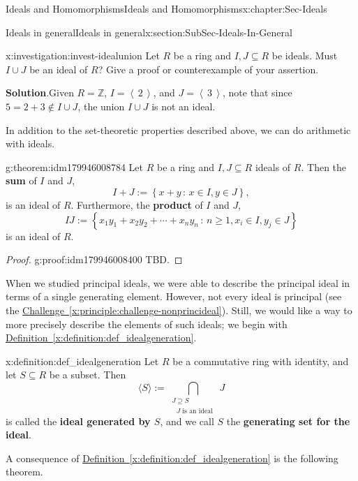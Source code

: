 \documentclass[oneside,10pt,]{book}
\newcommand{\blocktitlefont}{\relax}
\newcommand{\xreffont}{\relax}
\newcommand{\terminology}[1]{\textbf{#1}}
\numberwithin{equation}{section}
\renewcommand{\ge}{\geqslant}
\newcommand{\ideal}[1]{\left\langle\, #1 \,\right\rangle}
\newcommand{\setof}[2]{{\left\{#1\,\colon\,#2\right\}}}
\def\Z{{\mathbb Z}}
\begin{document}
\begin{chapterptx}{Ideals and Homomorphisms}{}{Ideals and Homomorphisms}{}{}{x:chapter:Sec-Ideals}
\begin{sectionptx}{Ideals in general}{}{Ideals in general}{}{}{x:section:SubSec-Ideals-In-General}
\begin{investigation}{}{x:investigation:invest-idealunion}
Let \(R\) be a ring and \(I,J\subseteq R\) be ideals. Must \(I\cup J\) be an ideal of \(R\)? Give a proof or counterexample of your assertion.%
\par\smallskip%
\noindent\textbf{\blocktitlefont Solution}.\hypertarget{g:solution:idm179946013984}{}\quad{}Given \(R = \Z\), \(I = \ideal{2}\), and \(J = \ideal{3}\), note that since \(5 = 2 + 3\notin I\cup J\), the union \(I\cup J\) is not an ideal.%
\end{investigation}
In addition to the set-theoretic properties described above, we can do arithmetic with ideals.%
\begin{theorem}{}{}{g:theorem:idm179946008784}%
Let \(R\) be a ring and \(I,J\subseteq R\) ideals of \(R\). Then the \terminology{sum} of \(I\) and \(J\),%
\begin{equation*}
I+J := \setof{x+y}{x\in I, y\in J},
\end{equation*}
is an ideal of \(R\). Furthermore, the \terminology{product} of \(I\) and \(J\),%
\begin{equation*}
IJ := \setof{x_1 y_1 + x_2 y_2 + \cdots + x_n y_n}{n\ge 1, x_i \in I, y_j\in J}
\end{equation*}
is an ideal of \(R\).%
\end{theorem}
\begin{proof}{}{g:proof:idm179946008400}
TBD.\end{proof}
When we studied principal ideals, we were able to describe the principal ideal in terms of a single generating element. However, not every ideal is principal (see the \hyperref[x:principle:challenge-nonprincideal]{Challenge~{\xreffont\ref{x:principle:challenge-nonprincideal}}}). Still, we would like a way to more precisely describe the elements of such ideals; we begin with \hyperref[x:definition:def_idealgeneration]{Definition~{\xreffont\ref{x:definition:def_idealgeneration}}}.%
\begin{definition}{}{x:definition:def_idealgeneration}%
Let \(R\) be a commutative ring with identity, and let \(S\subseteq R\) be a subset. Then%
\begin{equation}
\langle S \rangle := \bigcap\limits_{\substack{J\supseteq S\\\text{ \(J\) is an ideal } } } J\label{x:men:eq_idealgeneratedbyset}
\end{equation}
is called the \terminology{ideal generated by \(S\)}, and we call \(S\) the \terminology{generating set for the ideal}.%
\end{definition}
A consequence of \hyperref[x:definition:def_idealgeneration]{Definition~{\xreffont\ref{x:definition:def_idealgeneration}}} is the following theorem.%

\end{sectionptx}
\end{chapterptx}
\end{document}
